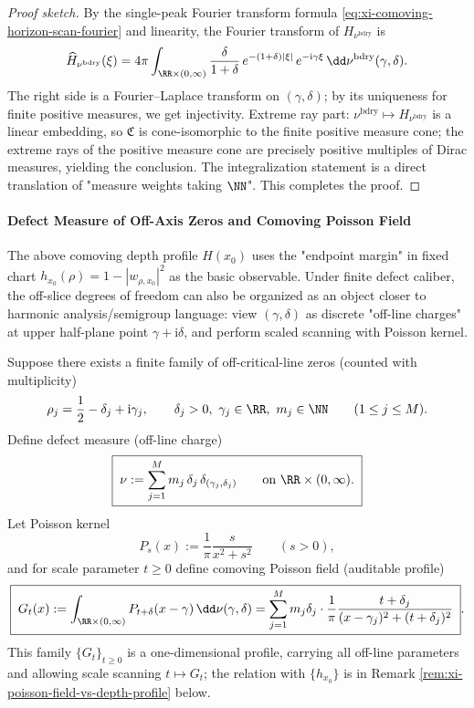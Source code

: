 \begin{proof}[Proof sketch]
By the single-peak Fourier transform formula \eqref{eq:xi-comoving-horizon-scan-fourier} and linearity, the Fourier transform of \(H_{\nu^{\mathrm{bdry}}}\) is
\[
\widehat H_{\nu^{\mathrm{bdry}}}(\xi)
=4\pi\int_{\RR\times(0,\infty)}\frac{\delta}{1+\delta}\,e^{-(1+\delta)|\xi|}\,e^{-\mathrm{i}\gamma\xi}\,\dd\nu^{\mathrm{bdry}}(\gamma,\delta).
\]
The right side is a Fourier--Laplace transform on \((\gamma,\delta)\); by its uniqueness for finite positive measures, we get injectivity.
Extreme ray part: \(\nu^{\mathrm{bdry}}\mapsto H_{\nu^{\mathrm{bdry}}}\) is a linear embedding, so \(\mathfrak{C}\) is cone-isomorphic to the finite positive measure cone; the extreme rays of the positive measure cone are precisely positive multiples of Dirac measures, yielding the conclusion.
The integralization statement is a direct translation of "measure weights taking \(\NN\)". This completes the proof.
\end{proof}

\paragraph{Defect Measure of Off-Axis Zeros and Comoving Poisson Field}
The above comoving depth profile \(H(x_0)\) uses the "endpoint margin" in fixed chart
\(
h_{x_0}(\rho)=1-|w_{\rho,x_0}|^2
\)
as the basic observable.
Under finite defect caliber, the off-slice degrees of freedom can also be organized as an object closer to harmonic analysis/semigroup language: view \((\gamma,\delta)\) as discrete "off-line charges" at upper half-plane point \(\gamma+\mathrm{i}\delta\), and perform scaled scanning with Poisson kernel.
\par
Suppose there exists a finite family of off-critical-line zeros (counted with multiplicity)
\[
\rho_j=\frac12-\delta_j+\mathrm{i}\gamma_j,\qquad
\delta_j>0,\ \gamma_j\in\RR,\ m_j\in\NN\qquad(1\le j\le M).
\]
Define defect measure (off-line charge)
\begin{equation}\label{eq:xi-offcritical-defect-measure-nu}
\boxed{\;
\nu:=\sum_{j=1}^{M} m_j\,\delta_j\,\delta_{(\gamma_j,\delta_j)}
\qquad\text{on}\ \RR\times(0,\infty).\;}
\end{equation}
Let Poisson kernel
\[
P_s(x):=\frac{1}{\pi}\frac{s}{x^2+s^2}\qquad(s>0),
\]
and for scale parameter \(t\ge 0\) define comoving Poisson field (auditable profile)
\begin{equation}\label{eq:xi-offcritical-comoving-poisson-field}
\boxed{\;
G_t(x)
:=\int_{\RR\times(0,\infty)}P_{t+\delta}(x-\gamma)\,\dd\nu(\gamma,\delta)
=\sum_{j=1}^{M}m_j\delta_j\cdot \frac{1}{\pi}\frac{t+\delta_j}{(x-\gamma_j)^2+(t+\delta_j)^2}\; }.
\end{equation}
This family \(\{G_t\}_{t\ge 0}\) is a one-dimensional profile, carrying all off-line parameters and allowing scale scanning \(t\mapsto G_t\); the relation with \(\{h_{x_0}\}\) is in Remark \ref{rem:xi-poisson-field-vs-depth-profile} below.

